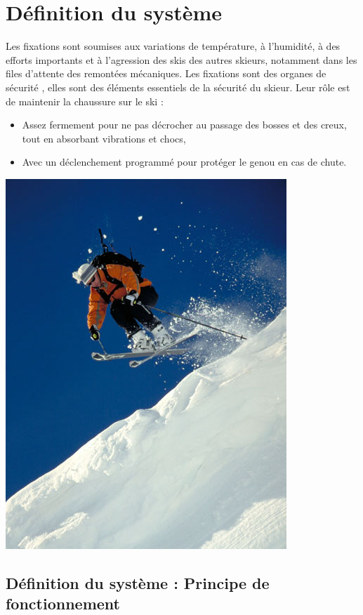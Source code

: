 

\section{Définition du système}

\begin{minipage}{0.55\linewidth}
  Les fixations sont soumises aux variations de température, à l'humidité, à des efforts importants et à l'agression des skis des autres skieurs, notamment dans les files d'attente des remontées mécaniques.
  Les fixations sont des \og organes de sécurité \fg, elles sont des éléments essentiels de la sécurité du skieur. Leur rôle est de maintenir la chaussure sur le ski :
  \begin{itemize}
   \item Assez fermement pour ne pas décrocher au passage des bosses et des creux, tout en absorbant vibrations et chocs,
   \item Avec un déclenchement programmé pour protéger le genou en cas de chute.
  \end{itemize}
 \end{minipage}
 \hfill
  \begin{minipage}{0.4\linewidth}
   \centering\includegraphics[width=0.7\linewidth]{img/skieur.jpg}
  \end{minipage}

\subsection{Définition du système : Principe de fonctionnement}

